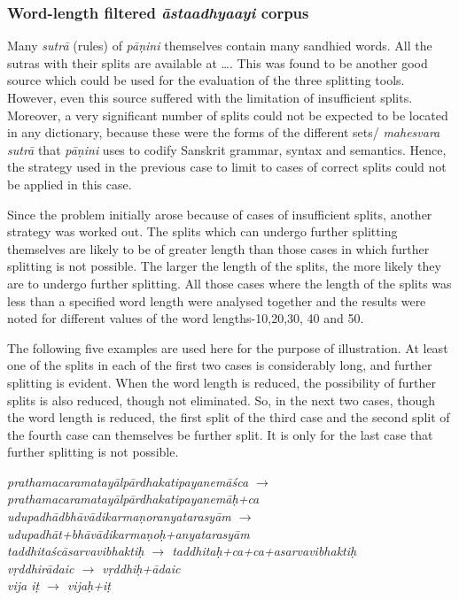 \documentclass[11pt]{article}
\begin{document}
\subsubsection{Word-length filtered \textit{āstaadhyaayi} corpus}
    Many \textit{sutrā} (rules) of \textit{pāṇini} themselves contain many sandhied words. All the sutras with their splits are available at …. This was found to be another good source which could be used for the evaluation of the three splitting tools.  However, even this source suffered with the limitation of insufficient splits.  Moreover, a very significant number of splits could not be expected to be located in any dictionary, because these were the forms of the different sets/ \textit{mahesvara sutrā} that \textit{pāṇini} uses to codify Sanskrit grammar, syntax and semantics. Hence, the strategy used in the previous case to limit to cases of correct splits could not be applied in this case.
    
Since the problem initially arose because of cases of insufficient splits, another strategy was worked out.  The splits which can undergo further splitting themselves are likely to be of greater length than those cases in which further splitting is not possible. The larger the length of the splits, the more likely they are to undergo further splitting. All those cases where the length of the splits was less than a specified word length were analysed together and the results were noted for different values of the word lengths-10,20,30, 40 and 50.

The following five examples are used here for the purpose of illustration. At least one of the splits in each of the first two cases is considerably long, and further splitting is evident.  When the word length is reduced, the possibility of further splits is also reduced, though not eliminated. So, in the next two cases, though the word length is reduced, the first split of the third case and the second split of the fourth case can themselves be further split. It is only for the last case that further splitting is not possible.

\textit{prathamacaramatayālpārdhakatipayanemāśca $\rightarrow$ prathamacaramatayālpārdhakatipayanemāḥ+ca \\
udupadhādbhāvādikarmaṇoranyatarasyām $\rightarrow$ udupadhāt+bhāvādikarmaṇoḥ+anyatarasyām \\
taddhitaścāsarvavibhaktiḥ $\rightarrow$ taddhitaḥ+ca+ca+asarvavibhaktiḥ \\
vṛddhirādaic $\rightarrow$ vṛddhiḥ+ādaic \\
vija iṭ $\rightarrow$ vijaḥ+iṭ \\                                                 
}
\end{document}
